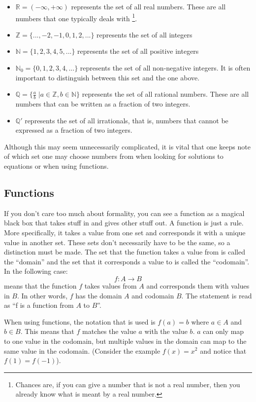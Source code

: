 \documentclass[a4paper,12pt]{article}
\begin{document}
\begin{itemize}
\item $\mathbb{R} = \left(-\infty, +\infty\right)$ represents the set of all real numbers. These are all numbers that one typically deals with \footnote{Chances are, if you can give a number that is not a real number, then you already know what is meant by a real number.}. 
\item $\mathbb{Z} = \{..., -2, -1, 0, 1, 2, ... \}$ represents the set of all integers
\item $\mathbb{N} = \{1, 2, 3, 4, 5, ... \}$ represents the set of all positive integers
\item $\mathbb{N}_0 = \{0, 1, 2, 3, 4, ... \}$ represents the set of all non-negative integers. It is often important to distinguish between this set and the one above.
\item $\mathbb{Q} = \{ \frac{a}{b}\; | a\in \mathbb{Z}, b \in \mathbb{N} \}$ represents the set of all rational numbers. These are all numbers that can be written as a fraction of two integers.
\item $\mathbb{Q}'$ represents the set of all irrationals, that is, numbers that cannot be expressed as a fraction of two integers.
\end{itemize}

Although this may seem unnecessarily complicated, it is vital that one keeps note of which set one may choose numbers from when looking for solutions to equations or when using functions.

\subsection{Functions}
If you don't care too much about formality, you can see a function as a magical black box that takes stuff in and gives other stuff out. A function is just a rule. More specifically, it takes a value from one set and corresponds it with a unique value in another set. These sets don't necessarily have to be the same, so a distinction must be made. The set that the function takes a value from is called the ``domain'' and the set that it corresponds a value to is called the ``codomain''. In the following case:
$$f:A \rightarrow B$$
means that the function $f$ takes values from $A$ and corresponds them with values in $B$. In other words, $f$ has the domain $A$ and codomain $B$. The statement is read as ``f is a function from $A$ to $B$''.

When using functions, the notation that is used is $f(a) = b$ where $a \in A$ and $b \in B$. This means that $f$ matches the value $a$ with the value $b$. $a$ can only map to one value in the codomain, but multiple values in the domain can map to the same value in the codomain. (Consider the example $f(x) = x^2$ and notice that $f(1) = f(-1)$).
\end{document}
